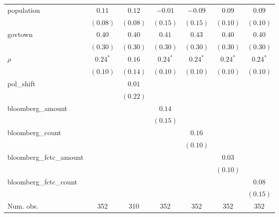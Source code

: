 \begin{table}[!h]
\begin{center}
\begin{tabular}{l c c c c c c }
population              & $0.11$       & $0.12$       & $-0.01$      & $-0.09$      & $0.09$       & $0.09$       \\
                        & $(0.08)$     & $(0.08)$     & $(0.15)$     & $(0.15)$     & $(0.10)$     & $(0.10)$     \\
govtown                 & $0.40$       & $0.40$       & $0.41$       & $0.43$       & $0.40$       & $0.40$       \\
                        & $(0.30)$     & $(0.30)$     & $(0.30)$     & $(0.30)$     & $(0.30)$     & $(0.30)$     \\
$\rho$                  & $0.24^{*}$   & $0.16$       & $0.24^{*}$   & $0.24^{*}$   & $0.24^{*}$   & $0.24^{*}$   \\
                        & $(0.10)$     & $(0.14)$     & $(0.10)$     & $(0.10)$     & $(0.10)$     & $(0.10)$     \\
pol\_shift              &              & $0.01$       &              &              &              &              \\
                        &              & $(0.22)$     &              &              &              &              \\
bloomberg\_amount       &              &              & $0.14$       &              &              &              \\
                        &              &              & $(0.15)$     &              &              &              \\
bloomberg\_count        &              &              &              & $0.16$       &              &              \\
                        &              &              &              & $(0.10)$     &              &              \\
bloomberg\_fctc\_amount &              &              &              &              & $0.03$       &              \\
                        &              &              &              &              & $(0.10)$     &              \\
bloomberg\_fctc\_count  &              &              &              &              &              & $0.08$       \\
                        &              &              &              &              &              & $(0.15)$     \\
\midrule
Num. obs.               & 352          & 310          & 352          & 352          & 352          & 352          \\

\end{tabular}
\end{center}
\end{table}
